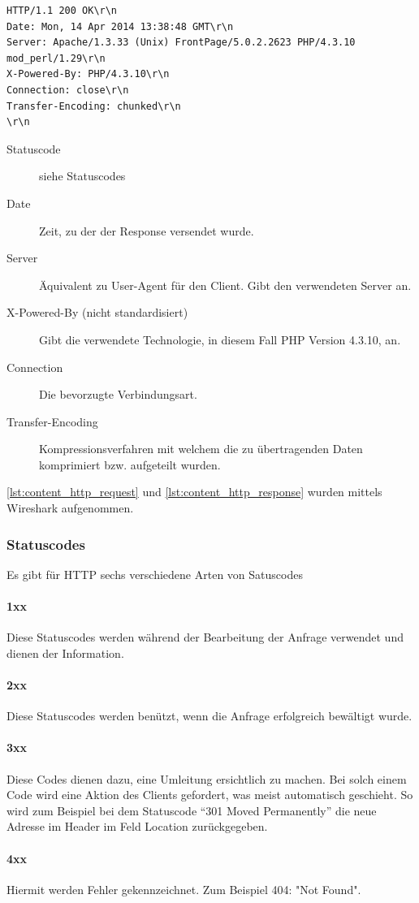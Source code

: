\begin{lstlisting}[style=custom, caption={HTTP-Response},label={lst:content_http_response}]
HTTP/1.1 200 OK\r\n
Date: Mon, 14 Apr 2014 13:38:48 GMT\r\n
Server: Apache/1.3.33 (Unix) FrontPage/5.0.2.2623 PHP/4.3.10 mod_perl/1.29\r\n
X-Powered-By: PHP/4.3.10\r\n
Connection: close\r\n
Transfer-Encoding: chunked\r\n
\r\n
\end{lstlisting}
\begin{description}
\item[Statuscode] siehe Statuscodes
\item[Date] Zeit, zu der der Response versendet wurde.
\item[Server] Äquivalent zu User-Agent für den Client. Gibt den verwendeten Server an. 
\item[X-Powered-By (nicht standardisiert)] Gibt die verwendete Technologie, in diesem Fall PHP Version 4.3.10, an. 
\item[Connection] Die bevorzugte Verbindungsart.
\item[Transfer-Encoding] Kompressionsverfahren mit welchem die zu übertragenden Daten komprimiert bzw. aufgeteilt wurden.
\end{description}
\autoref{lst:content_http_request} und \autoref{lst:content_http_response} wurden mittels Wireshark aufgenommen.
\subsubsection{Statuscodes}
Es gibt für HTTP sechs verschiedene Arten von Satuscodes
\paragraph{1xx}
Diese Statuscodes werden während der Bearbeitung der Anfrage verwendet und dienen der Information.
\paragraph{2xx}
Diese Statuscodes werden benützt, wenn die Anfrage erfolgreich bewältigt wurde.  
\paragraph{3xx}
Diese Codes dienen dazu, eine Umleitung ersichtlich zu machen. Bei solch einem Code wird eine Aktion des Clients gefordert, was meist automatisch geschieht. So wird zum Beispiel bei dem Statuscode \enquote{301 Moved Permanently} die neue Adresse im Header im Feld Location zurückgegeben.
\paragraph{4xx}
Hiermit werden Fehler gekennzeichnet. Zum Beispiel 404: "Not Found".
